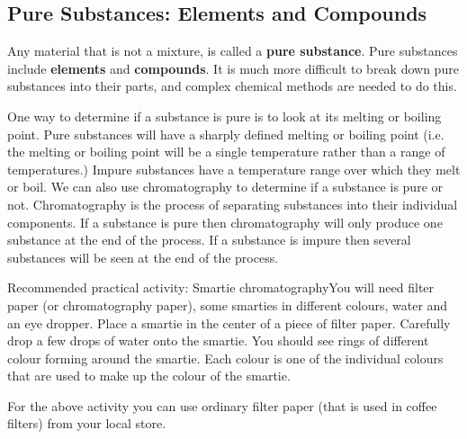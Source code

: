             \subsection{ Pure Substances: Elements and Compounds}
            \nopagebreak
      \label{m38708*id63273}Any material that is not a mixture, is called a \textbf{pure substance}. Pure substances include \textbf{elements} and \textbf{compounds}. It is much more difficult to break down pure substances into their parts, and complex chemical methods are needed to do this.\par 
      \label{m38708*eip-862}One way to determine if a substance is pure is to look at its melting or boiling point. Pure substances will have a sharply defined melting or boiling point (i.e. the melting or boiling point will be a single temperature rather than a range of temperatures.) Impure substances have a temperature range over which they melt or boil. We can also use chromatography to determine if a substance is pure or not. Chromatography is the process of separating substances into their individual components. If a substance is pure then chromatography will only produce one substance at the end of the process. If a substance is impure then several substances will be seen at the end of the process. \par \label{m38708*eip-122}
\begin{activity}{Recommended practical activity: Smartie chromatography}{You will need filter paper (or chromatography paper), some smarties in different colours, water and an eye dropper. \newline
Place a smartie in the center of a piece of filter paper. Carefully drop a few drops of water onto the smartie. You should see rings of different colour forming around the smartie. Each colour is one of the individual colours that are used to make up the colour of the smartie.}
\end{activity}
\par \label{m38708*eip-392}
	\Tip
      {For the above activity you can use ordinary filter paper (that is used in coffee filters) from your local store.}
	\par
      \label{m38708*uid25}
